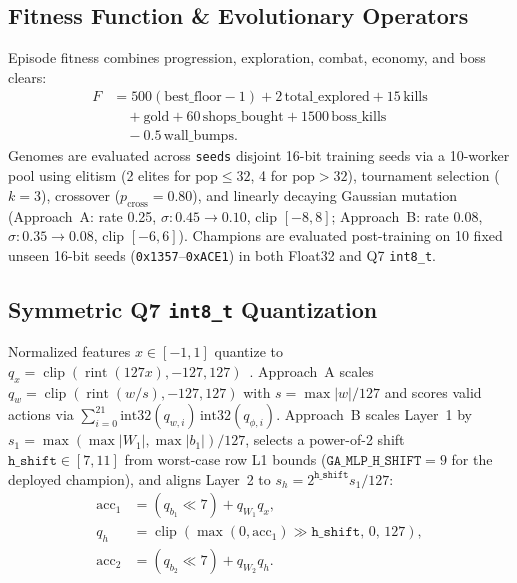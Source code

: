 \documentclass[conference]{IEEEtran}
\begin{document}
\subsection{Fitness Function \& Evolutionary Operators}
Episode fitness combines progression, exploration, combat, economy, and boss clears:
\begin{equation}
\begin{aligned}
F &= 500(\text{best\_floor} - 1) + 2\,\text{total\_explored} + 15\,\text{kills} \\
  &\quad + \text{gold} + 60\,\text{shops\_bought} + 1500\,\text{boss\_kills} \\
  &\quad - 0.5\,\text{wall\_bumps}.
\end{aligned}
\end{equation}
Genomes are evaluated across \texttt{seeds} disjoint 16-bit training seeds via a 10-worker pool using elitism (2 elites for $\text{pop} \le 32$, 4 for $\text{pop} > 32$), tournament selection ($k=3$), crossover ($p_{\text{cross}} = 0.80$), and linearly decaying Gaussian mutation~\cite{goldberg,salimans} (Approach~A: rate 0.25, $\sigma: 0.45 \to 0.10$, clip $[-8, 8]$; Approach~B: rate 0.08, $\sigma: 0.35 \to 0.08$, clip $[-6, 6]$). Champions are evaluated post-training on 10 fixed unseen 16-bit seeds (\texttt{0x1357}--\texttt{0xACE1}) in both Float32 and Q7 \texttt{int8\_t}.

\subsection{Symmetric Q7 \texttt{int8\_t} Quantization}
Normalized features $x \in [-1, 1]$ quantize to $q_x = \operatorname{clip}(\operatorname{rint}(127x), -127, 127)$~\cite{jacob}. Approach~A scales $q_w = \operatorname{clip}(\operatorname{rint}(w/s), -127, 127)$ with $s = \max|w|/127$ and scores valid actions via $\sum_{i=0}^{21} \text{int32}(q_{w,i})\,\text{int32}(q_{\phi,i})$. Approach~B scales Layer~1 by $s_1 = \max(\max|W_1|, \max|b_1|)/127$, selects a power-of-2 shift $\texttt{h\_shift} \in [7, 11]$ from worst-case row L1 bounds ($\texttt{GA\_MLP\_H\_SHIFT} = 9$ for the deployed champion), and aligns Layer~2 to $s_h = 2^{\texttt{h\_shift}} s_1 / 127$:
\begin{align}
\text{acc}_1 &= (q_{b_1} \ll 7) + q_{W_1} q_x, \\
q_h &= \operatorname{clip}\!\left(\max(0, \text{acc}_1) \gg \texttt{h\_shift},\, 0,\, 127\right), \\
\text{acc}_2 &= (q_{b_2} \ll 7) + q_{W_2} q_h.
\end{align}
\end{document}
